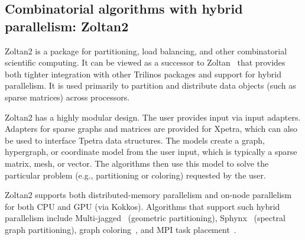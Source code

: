 \subsection{Combinatorial algorithms with hybrid parallelism: Zoltan2}
Zoltan2 is a package for partitioning, load balancing, and other combinatorial scientific computing. It can be viewed as a successor to Zoltan~\cite{Boman2012} that provides both tighter integration with other Trilinos packages and support for hybrid parallelism. It is used primarily to partition and distribute data objects (such as sparse matrices) across processors.

Zoltan2 has a highly modular design. The user provides input via
input adapters. Adapters for sparse graphs and matrices are provided for Xpetra, which can also be used to interface Tpetra data structures.
The models create a graph, hypergraph, or coordinate model from the user input, which is typically a sparse matrix, mesh, or vector.
The algorithms then use this model to solve the particular problem (e.g., partitioning or coloring) requested by the user.

Zoltan2 supports both distributed-memory parallelism and on-node parallelism for both CPU and GPU (via Kokkos).
Algorithms that support such hybrid parallelism include Multi-jagged~\cite{Z1} (geometric partitioning), Sphynx~\cite{Z2} (spectral graph partitioning), graph coloring~\cite{Z5}, and MPI task placement~\cite{Z3}.
